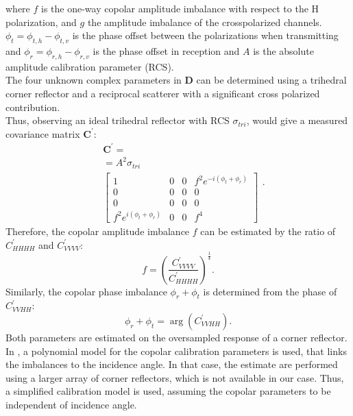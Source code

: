 where $f$ is the one-way copolar amplitude imbalance with respect to the H polarization, and $g$ the amplitude imbalance of the crosspolarized channels. $\phi_t = \phi_{t,h} -\phi_{t,v}$ is the phase offset between the polarizations when transmitting and $\phi_{r} = \phi_{r,h} -\phi_{r,v}$ is the phase offset in reception and $A$ is the absolute amplitude calibration parameter (RCS)\cite{Ainsworth2006a, Fore2015}.\\
The four unknown complex parameters in $\mathbf{D}$ can be determined using a trihedral corner reflector and a reciprocal scatterer with a significant cross polarized contribution\cite{Sarabandi1989,Pipia2009}.\\
Thus, observing an ideal trihedral reflector with RCS $\sigma_{tri}$, would give 
a measured covariance matrix $\mathbf{C^{\prime}}$:
\begin{equation}
	\begin{aligned}
	&\mathbf{C^{\prime}} =\\
	&= A^2 \sigma_{tri}\\
	&\begin{bmatrix}
		1 & 0 & 0 & f^2 e^{-i \left(\phi_t + \phi_r\right)}\\
		0 & 0 & 0 & 0\\
		0 & 0 & 0 & 0\\
		f^2 e^{i \left(\phi_t + \phi_r\right)} & 0 & 0 & f^4
	\end{bmatrix}
	\end{aligned}.
\end{equation}
Therefore, the  copolar amplitude imbalance $f$ can be estimated by the ratio of $C_{HHHH}^\prime$ and $C_{VVVV}^\prime$:
\begin{equation}
	f = \left(\frac{C^{\prime}_{VVVV}}{C^{\prime}_{HHHH}}\right)^{\frac{1}{4}}.
\end{equation}
Similarly, the copolar phase imbalance $\phi_r + \phi_t$ is determined from the phase of $C_{VVHH}^{\prime}$:
\begin{equation}
	\phi_r + \phi_t = \operatorname{arg}\left(C_{VVHH}^\prime\right).
\end{equation}
Both parameters are estimated on the oversampled response of a corner reflector. In \cite{Fore2015}, a polynomial model for the copolar calibration parameters is used, that links the imbalances to the incidence angle. In that case, the estimate are performed using a larger array of corner reflectors, which is not available in our case. Thus, a simplified calibration model is used, assuming the copolar parameters to be independent of incidence angle.\\ 
